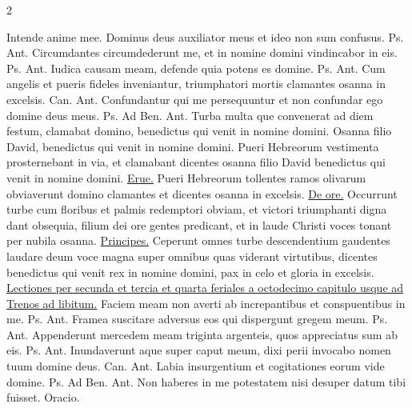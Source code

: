 \begin{multicols*}{2}
\begin{responsory}
\end{responsory}%
\V Intende anime mee.
 Dominus deus auxiliator meus et ideo non sum confusus. {\color{Red} Ps.}  {\color{Red} Ant.} Circumdantes circumdederunt me, et in nomine domini vindincabor in eis. {\color{Red} Ps.}  {\color{Red} Ant.} Iudica causam meam, defende quia potens es domine. {\color{Red} Ps.}  {\color{Red} Ant.} Cum angelis et pueris fideles inveniantur, triumphatori mortis clamantes osanna in excelsis. {\color{Red} Can.}  {\color{Red} Ant.} Confundantur qui me persequuntur et non confundar ego domine deus meus. {\color{Red} Ps.}  {\color{Red} Ad Ben. Ant.} Turba multa que convenerat ad diem festum, clamabat domino, benedictus qui venit in nomine domini.
 Osanna filio David, benedictus qui venit in nomine domini.
 Pueri Hebreorum vestimenta prosternebant in via, et clamabant dicentes osanna filio David benedictus qui venit in nomine domini. \R \hyperlink{erue-a-framea}{Erue.}
 Pueri Hebreorum tollentes ramos olivarum obviaverunt domino clamantes et dicentes osanna in excelsis. \R \hyperlink{de-ore-leonis}{De ore.}
 Occurrunt turbe cum floribus et palmis redemptori obviam, et victori triumphanti digna dant obsequia, filium dei ore gentes predicant, et in laude Christi voces tonant per nubila osanna. \R \hyperlink{principes-persecuti}{Principes.}
 Ceperunt omnes turbe descendentium gaudentes laudare deum voce magna super omnibus quas viderant virtutibus, dicentes benedictus qui venit rex in nomine domini, pax in celo et gloria in excelsis.
\newline \ul{Lectiones per secunda et tercia et quarta feriales a octodecimo capitulo usque ad Trenos ad libitum.}
 Faciem meam non averti ab increpantibus et conspuentibus in me. {\color{Red} Ps.}  {\color{Red} Ant.} Framea suscitare adversus eos qui dispergunt gregem meum. {\color{Red} Ps.}  {\color{Red} Ant.} Appenderunt mercedem meam triginta argenteis, quos appreciatus sum ab eis. {\color{Red} Ps.}  {\color{Red} Ant.} Inundaverunt aque super caput meum, dixi perii invocabo nomen tuum domine deus. {\color{Red} Can.}  {\color{Red} Ant.} Labia insurgentium et cogitationes eorum vide domine. {\color{Red} Ps.}  {\color{Red} Ad Ben. Ant.} Non haberes in me potestatem nisi desuper datum tibi fuisset. {\color{Red} Oracio.}

\end{multicols*}
